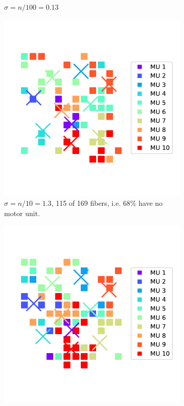 \begin{figure}
\begin{subfigure}[t]{0.48\textwidth}
    \caption{$\sigma = n/100 = 0.13$}%
    \label{fig:MU_fibre_distribution_13x13_10_2d_fiber_distribution_sigma}%
  \end{subfigure}
  \begin{subfigure}[t]{0.48\textwidth}%
    \centering%
    \includegraphics[width=\textwidth]{images/motor_unit_assignment/MU_fibre_distribution_sparse_13x13_10_2d_fiber_distribution.pdf}%
    \caption{$\sigma = n/10 = 1.3$, 115 of 169 fibers, i.e. 68\% have no motor unit.}%
    \label{fig:MU_fibre_distribution_sparse_13x13_10_2d_fiber_distribution}%
  \end{subfigure}
  \begin{subfigure}[t]{0.48\textwidth}%
    \centering%
    \includegraphics[width=\textwidth]{images/motor_unit_assignment/MU_fibre_distribution_sparse_13x13_10_sigma_2d_fiber_distribution.pdf}%

\end{subfigure}
\end{figure}
